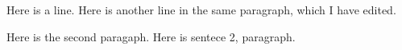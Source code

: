 \documentclass{article}
\begin{document}
Here is a line.
Here is another line in the same paragraph, which I have edited.

Here is the second paragaph.
Here is sentece 2, paragraph.
\end{document}
